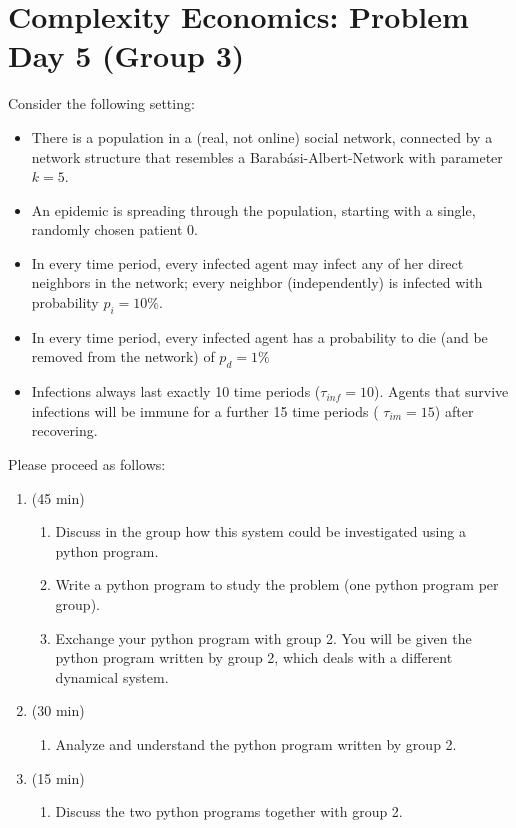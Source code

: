 \documentclass[25pt,a4paper]{article}
\begin{document}
\setlength{\emergencystretch}{0.5cm}
\pagestyle{empty}
\newcommand{\thegroup}{3}
\newcommand{\ifcasewrapper}[1]
{\ifcase#1\relax\or 
    \newcommand{\theothergroup}{2} %
\or 
    \newcommand{\theothergroup}{1} %
\or 
    \newcommand{\theothergroup}{4} %
\or 
    \newcommand{\theothergroup}{3} %
\fi
}
\ifcasewrapper{\thegroup}
\section*{Complexity Economics: Problem Day 5 (Group \thegroup)}

Consider the following setting:
\begin{itemize}
  \item There is a population in a (real, not online) social network, connected by a network structure that resembles a Barab\'{a}si-Albert-Network with parameter $k=5$.
  \item An epidemic is spreading through the population, starting with a single, randomly chosen patient 0.
  \item In every time period, every infected agent may infect any of her direct neighbors in the network; every neighbor (independently) is infected with probability $p_i=10\%$.
  \item In every time period, every infected agent has a probability to die (and be removed from the network) of $p_d=1\%$
  \item Infections always last exactly 10 time periods  ($\tau_{inf}=10$). Agents that survive infections will be immune for a further 15 time periods ( $\tau_{im}=15$) after recovering.
\end{itemize}

$$$$
Please proceed as follows:
\begin{enumerate}
\item (45 min)
\begin{enumerate}
\item Discuss in the group how this system could be investigated using a python program.
\item Write a python program to study the problem (one python program per group).
\item Exchange your python program with group \theothergroup. You will be given the python program written by group \theothergroup, which deals with a different dynamical system.
\end{enumerate}
\item (30 min)
\begin{enumerate}
\item Analyze and understand the python program written by group \theothergroup.
\end{enumerate}
\item (15 min)
\begin{enumerate}
\item Discuss the two python programs together with group \theothergroup.
\end{enumerate}
\end{enumerate}
\end{document}
